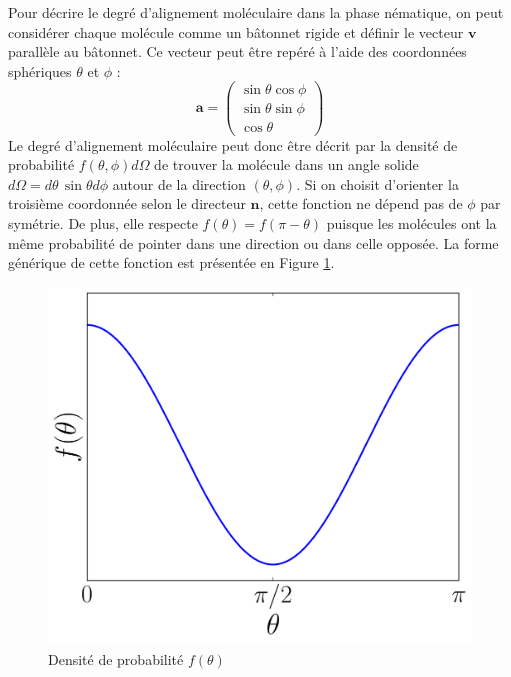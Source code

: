 \documentclass[11pt,a4paper]{article}
\numberwithin{equation}{section}
\begin{document}
Pour décrire le degré d'alignement moléculaire dans la phase nématique, on peut considérer chaque molécule comme un bâtonnet rigide et définir le vecteur $\bm{v}$ parallèle au bâtonnet. Ce vecteur peut être repéré à l'aide des coordonnées sphériques $\theta$ et $\phi$ :
\begin{equation}
\bm{a} =
\begin{pmatrix}
 \sin \theta \cos \phi \\
 \sin \theta \sin \phi \\
 \cos \theta 
 \end{pmatrix} 
\end{equation}
Le degré d'alignement moléculaire peut donc être décrit par la densité de probabilité $f(\theta,\phi)d\Omega$ de trouver la molécule dans un angle solide $d\Omega = d\theta\, \sin \theta d\phi$ autour de la direction $(\theta,\phi)$. Si on choisit d'orienter la troisième coordonnée selon le directeur $\bm{n}$, cette fonction ne dépend pas de $\phi$ par symétrie. De plus, elle respecte $f(\theta) = f(\pi - \theta)$ puisque les molécules ont la même probabilité de pointer dans une direction ou dans celle opposée. La forme générique de cette fonction est présentée en Figure \ref{distrib}.

\begin{figure}[h]
    \centering	    
	\includegraphics[scale=0.4]{figures/distrib.pdf}
    \caption{Densité de probabilité $f(\theta)$}
    	\label{distrib} 
\end{figure}
\end{document}
